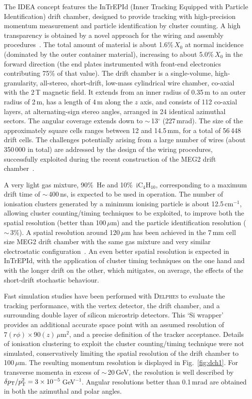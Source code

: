 The IDEA concept features the InTrEPId (Inner Tracking Equipped with Particle Identification) drift chamber, 
designed to provide tracking with high-precision momentum measurement and particle identification by cluster counting. 
A high transparency is obtained by a novel approach for the wiring and assembly procedures~\cite{chiarello}. 
The total amount of material is about 1.6\%\,$X_0$ at normal incidence (dominated by the outer container material), 
increasing to about 5.0\%\,$X_0$ in the forward direction 
(the end plates instrumented with front-end electronics contributing 75\% of that value). 
The drift chamber is a single-volume, high-granularity, all-stereo, short-drift, low-mass cylindrical wire chamber, 
co-axial with the 2\,T magnetic field. 
It extends from an inner radius of 0.35\,m to an outer radius of 2\,m, has a length of 4\,m along the $z$ axis, 
and consists of 112 co-axial layers, at alternating-sign stereo angles, arranged in 24 identical azimuthal sectors. 
The angular coverage extends down to $\sim$\,13$^\circ$ (227\,mrad). 
The size of the approximately square cells ranges between 12 and 14.5\,mm, for a total of 56\,448 drift cells.
The challenges potentially arising from a large number of wires (about 350\,000 in total) 
are addressed by the design of the wiring procedures, 
successfully exploited during the recent construction of the MEG2 drift chamber~\cite{chiappini2}. 

A very light gas mixture, 90\%~He and 10\%~iC$_4$H$_{10}$, corresponding to a maximum drift time of $\sim$\,400\,ns, 
is expected to be used in operation. 
The number of ionisation clusters generated by a minimum ionising particle is about 12.5\,cm$^{-1}$, 
allowing cluster counting/timing techniques to be exploited,
to improve both the spatial resolution (better than 100\,$\mu$m)
and the particle identification resolution ($\sim$\,3\%).
A spatial resolution around 120\,$\mu$m has been achieved in the 7\,mm cell size MEG2 drift chamber 
with the same gas mixture and very similar electrostatic configuration~\cite{afanaciev}. 
An even better spatial resolution is expected in InTrEPId, 
with the application of cluster timing techniques on the one hand and with the longer drift on the other, 
which mitigates, on average, the effects of the short-drift stochastic behaviour.

Fast simulation studies have been performed with \textsc{Delphes} to evaluate the tracking performance, 
with the vertex detector, the drift chamber, and a surrounding double layer of silicon microstrip detectors. 
This `Si wrapper' provides an additional accurate space point with an assumed resolution of $7 (r\phi) \times 90 (z)$\,$\mu$m$^2$, 
and a precise definition of the tracker acceptance. 
Details of ionisation clustering to exploit the cluster counting/timing technique were not simulated, 
conservatively limiting the spatial resolution of the drift chamber to 100\,$\mu$m. 
The resulting momentum resolution is displayed in Fig.~\ref{fig:dch1}. 
For transverse momenta in excess of $\sim$\,20\,GeV, 
the resolution is well described by $\delta p_\mathrm{T} / p_\mathrm{T}^2 = 3 \times 10^{-5}$\,GeV$^{-1}$.
Angular resolutions better than 0.1\,mrad are obtained in both the azimuthal and polar angles. 

